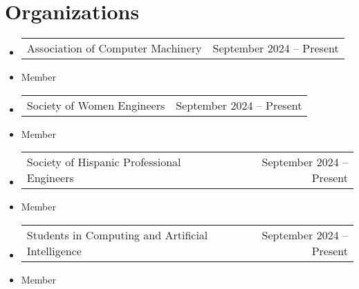 \documentclass[letterpaper,11pt]{article}
\makeatletter
\newcommand{\resumeItem}[1]{
  \item\small{
    {#1 \vspace{-2pt}}
  }
}
\newcommand{\resumeProjectHeading}[2]{
    \item
    \begin{tabular*}{0.97\textwidth}{l@{\extracolsep{\fill}}r}
      \small#1 & #2 \\
    \end{tabular*}\vspace{-7pt}
}
\newcommand{\resumeSubHeadingListStart}{\begin{itemize}[leftmargin=0.15in, label={}]}
\newcommand{\resumeSubHeadingListEnd}{\end{itemize}}
\makeatother
\begin{document}
\section{Organizations}

\resumeSubHeadingListStart
\resumeProjectHeading
    {{Association of Computer Machinery} \emph}{September 2024 -- Present}
    \resumeItem \small{Member}
\resumeProjectHeading
    {{Society of Women Engineers} \emph}{September 2024 -- Present}
    \resumeItem \small{Member}
\resumeProjectHeading
    {{Society of Hispanic Professional Engineers} \emph}{September 2024 -- Present}  
    \resumeItem \small{Member}
\resumeProjectHeading
    {{Students in Computing and Artificial Intelligence} \emph}{September 2024 -- Present}
    \resumeItem \small{Member}
\resumeSubHeadingListEnd

\end{document}

